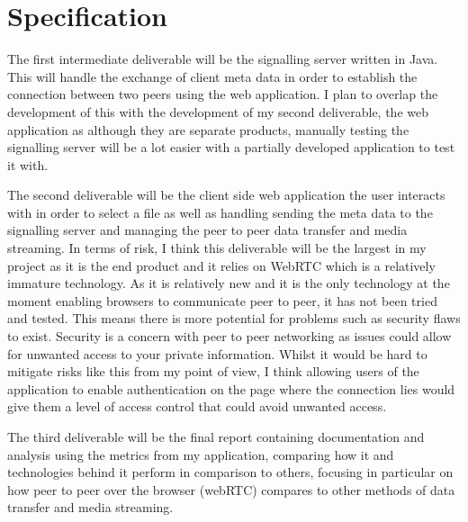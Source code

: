 \documentclass[]{report}
\begin{document}
	\section{Specification}
			The first intermediate deliverable will be the signalling server written in Java. This will handle the exchange of client meta data in order to establish the connection between two peers using the web application. I plan to overlap the development of this with the development of my second deliverable, the web application as although they are separate products, manually testing the signalling server will be a lot easier with a partially developed application to test it with.
			
			The second deliverable will be the client side web application the user interacts with in order to select a file as well as handling sending the meta data to the signalling server and managing the peer to peer data transfer and media streaming. In terms of risk, I think this deliverable will be the largest in my project as it is the end product and it relies on WebRTC which is a relatively immature technology. As it is relatively new and it is the only technology at the moment enabling browsers to communicate peer to peer, it has not been tried and tested. This means there is more potential for problems such as security flaws to exist. Security is a concern with peer to peer networking as issues could allow for unwanted access to your private information. Whilst it would be hard to mitigate risks like this from my point of view, I think allowing users of the application to enable authentication on the page where the connection lies would give them a level of access control that could avoid unwanted access.
			
			The third deliverable will be the final report containing documentation and analysis using the metrics	from my application, comparing how it and technologies behind it perform in comparison to others, focusing in particular on how peer to peer over the browser (webRTC) compares to other methods of data transfer and media streaming.
			
\end{document}
